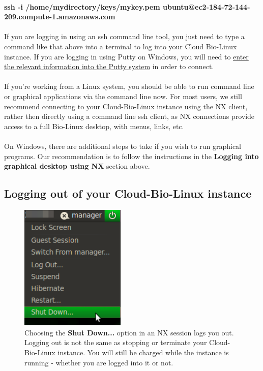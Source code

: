 \paragraph{ssh -i /home/mydirectory/keys/mykey.pem ubuntu@ec2-184-72-144-209.compute-1.amazonaws.com}

\paragraph{}If you are logging in using an ssh command line tool, you just need to type a command like that above into a terminal to log into your Cloud Bio-Linux instance. If you are logging in using Putty on Windows, you will need to \href{http://www.ualberta.ca/CNS/RESEARCH/LinuxClusters/pka-putty.html}{enter the relevant information into the Putty system} in order to connect.

\paragraph{}If you're working from a Linux system, you should be able to run command line or graphical applications via the command line now. For most users, we still recommend connecting to your Cloud-Bio-Linux instance using the NX client, rather then directly using a command line ssh client, as NX connections provide access to a full Bio-Linux desktop, with menus, links, etc. 

\paragraph{}On Windows, there are additional steps to take if you wish to run graphical programs. Our recommendation is to follow the instructions in the  \textbf{Logging into graphical desktop using NX} section above.


\subsection{Logging out of your Cloud-Bio-Linux instance}

\begin{figure}
\includegraphics[width=50mm]{"images/nxshutdown"}
\caption[Logging out of NX]{\label{fig:nxshutdown}Choosing the \textbf{Shut Down...} option in an NX session logs you out. Logging out is not the same as stopping or terminate your Cloud-Bio-Linux instance. You will still be charged while the instance is running - whether you are logged into it or not.}
\end{figure}

